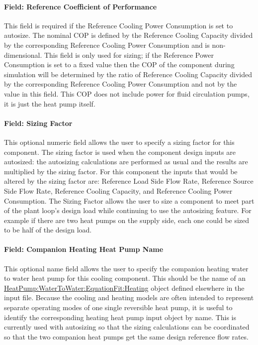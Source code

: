 \paragraph{Field: Reference Coefficient of Performance}\label{field-cooling-nom-COP}

This field is required if the Reference Cooling Power Consumption is set to autosize. The nominal COP is defined by the Reference Cooling Capacity divided by the corresponding Reference Cooling Power Consumption and is non-dimensional. This field is only used for sizing; if the Reference Power Consumption is set to a fixed value then the COP of the component during simulation will be determined by the ratio of Reference Cooling Capacity divided by the corresponding Reference Cooling Power Consumption and not by the value in this field. This COP does not include power for fluid circulation pumps, it is just the heat pump itself.

\paragraph{Field: Sizing Factor}\label{field-cooling-siz-fac}

This optional numeric field allows the user to specify a sizing factor for this component. The
sizing factor is used when the component design inputs are autosized: the autosizing calculations
are performed as usual and the results are multiplied by the sizing factor. For this component
the inputs that would be altered by the sizing factor are: Reference Load Side Flow Rate, Reference Source Side Flow Rate, Reference Cooling Capacity, and Reference Cooling Power Consumption. The Sizing Factor allows the user to size
a component to meet part of the plant loop's design load while continuing to use the autosizing feature. For example if there are two heat pumps on the supply side, each one could be sized to be half of the design load.

\paragraph{Field: Companion Heating Heat Pump Name}\label{field-heating-companion-name}

This optional name field allows the user to specify the companion heating water to water heat pump for this cooling component. This should be the name of an \hyperref[heatpumpwatertowaterequationfitheating]{HeatPump:WaterToWater:EquationFit:Heating} object defined elsewhere in the input file. Because the cooling and heating models are often intended to represent separate operating modes of one single reversible heat pump, it is useful to identify the corresponding heating heat pump input object by name. This is currently used with autosizing so that the sizing calculations can be coordinated so that the two companion heat pumps get the same design reference flow rates.

